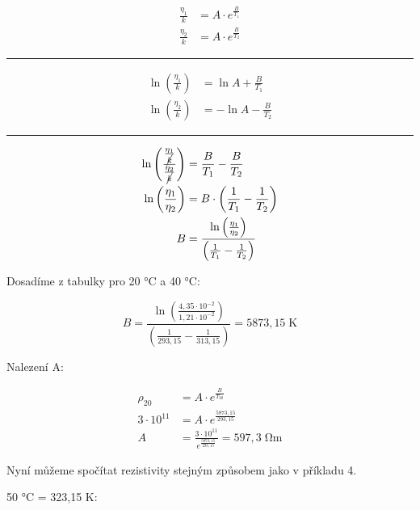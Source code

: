 \begin{align*}
    \frac{\eta_1}{k} &= A \cdot e^\frac{B}{T_1}\\
    \frac{\eta_2}{k} &= A \cdot e^\frac{B}{T_2}
\end{align*}

\begin{center}
    \noindent\rule{5cm}{0.4pt}
\end{center}

\begin{align*}
    \ln \left( \frac{\eta_1}{k} \right) & = \ln A + \frac{B}{T_1}\\
    \ln \left( \frac{\eta_2}{k} \right) & = - \ln A - \frac{B}{T_2}
\end{align*}

\begin{center}
    \noindent\rule{5cm}{0.4pt}
\end{center}

\newpage

\begin{align*}
    \ln \left( \frac{\frac{\eta_1}{\cancel{k}}}{\frac{\eta_2}{\cancel{k}}} \right) &= \frac{B}{T_1} - \frac{B}{T_2} \\
    \ln \left( \frac{\eta_1}{\eta_2} \right) &= B \cdot \left( \frac{1}{T_1} - \frac{1}{T_2} \right) \\
    B &= \frac{\ln \left( \frac{\eta_1}{\eta_2} \right)}{\left( \frac{1}{T_1} - \frac{1}{T_2} \right)}
\end{align*}

Dosadíme z tabulky pro 20 \si{\celsius} a 40 \si{\celsius}:

\begin{equation*}
    B = \frac{\ln \left( \frac{4,35 \cdot 10^{-2}}{1,21 \cdot 10^{-2}} \right)}{\left( \frac{1}{293,15} - \frac{1}{313,15} \right)} = 5873,15 \; \si{\kelvin}
\end{equation*}

Nalezení A:

\begin{align*}
    \rho_{20} &= A \cdot e^{\frac{B}{T_{20}}} \\
    3 \cdot 10^{11} &= A \cdot e^\frac{5873,15}{293,15} \\
    A &= \frac{3 \cdot 10^{11}}{e^\frac{5873,15}{293,15}} = 597,3 \; \si{\ohm\meter}
\end{align*}

Nyní můžeme spočítat rezistivity stejným způsobem jako v příkladu 4.

50 \si{\celsius} = 323,15 \si{\kelvin}:

